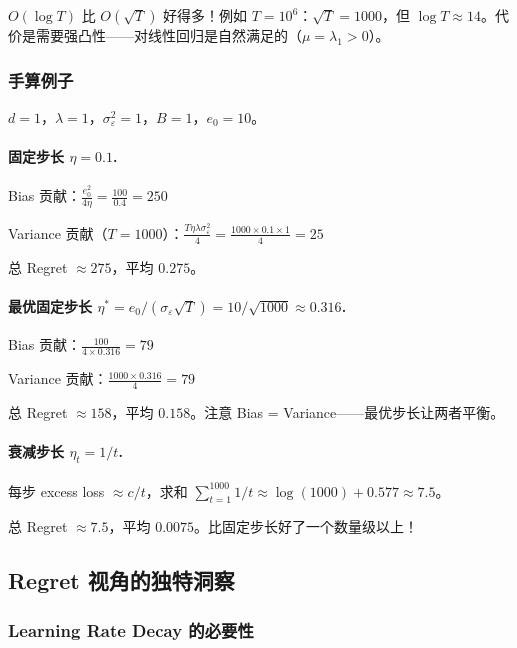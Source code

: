 \documentclass[12pt, a4paper]{ctexart}
\begin{document}
$O(\log T)$ 比 $O(\sqrt{T})$ 好得多！例如 $T = 10^6$：$\sqrt{T} = 1000$，但 $\log T \approx 14$。代价是需要强凸性——对线性回归是自然满足的（$\mu = \lambda_1 > 0$）。

\subsubsection{手算例子}

$d = 1$，$\lambda = 1$，$\sigma_\varepsilon^2 = 1$，$B = 1$，$e_0 = 10$。

\paragraph{固定步长 $\eta = 0.1$.}

Bias 贡献：$\frac{e_0^2}{4\eta} = \frac{100}{0.4} = 250$

Variance 贡献（$T = 1000$）：$\frac{T\eta\lambda\sigma_\varepsilon^2}{4} = \frac{1000 \times 0.1 \times 1}{4} = 25$

总 Regret $\approx 275$，平均 $0.275$。

\paragraph{最优固定步长 $\eta^* = e_0/(\sigma_\varepsilon\sqrt{T}) = 10/\sqrt{1000} \approx 0.316$.}

Bias 贡献：$\frac{100}{4 \times 0.316} = 79$

Variance 贡献：$\frac{1000 \times 0.316}{4} = 79$

总 Regret $\approx 158$，平均 $0.158$。注意 Bias = Variance——最优步长让两者平衡。

\paragraph{衰减步长 $\eta_t = 1/t$.}

每步 excess loss $\approx c/t$，求和 $\sum_{t=1}^{1000} 1/t \approx \log(1000) + 0.577 \approx 7.5$。

总 Regret $\approx 7.5$，平均 $0.0075$。比固定步长好了一个数量级以上！

\subsection{Regret 视角的独特洞察}

\subsubsection{Learning Rate Decay 的必要性}
\end{document}
